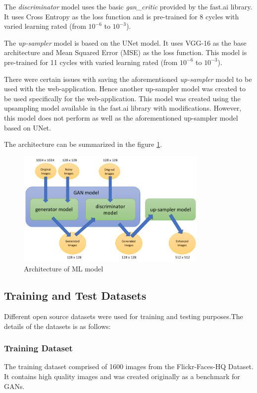 \documentclass[conference]{IEEEtran}
\begin{document}
			\par The \emph{discriminator} model uses the basic \emph{gan\_critic} provided by the fast.ai library\cite{b7}. It uses Cross Entropy\cite{b13} as the loss function and is pre-trained for 8 cycles with varied learning rated (from $10^{-6}$ to $10^{-3}$).
			
			\par The \emph{up-sampler} model is based on the UNet model\cite{b10}. It uses VGG-16\cite{b14} as the base architecture and Mean Squared Error (MSE)\cite{b12} as the loss function. This model is pre-trained for 11 cycles with varied learning rated (from $10^{-6}$ to $10^{-3}$).
			
			\par There were certain issues with saving the aforementioned \emph{up-sampler} model to be used with the web-application. Hence another up-sampler model was created to be used specifically for the web-application. This model was created using the upsampling model available in the fast.ai library\cite{b7} with modifications. However, this model does not perform as well as the aforementioned up-sampler model based on UNet.
			
			\par The architecture can be summarized in the figure \ref{arch-fig}.
			
				\begin{figure}[htbp]
				\centerline{\includegraphics[width=25em]{arch_srgan.png}}
				\caption{Architecture of ML model}
				\label{arch-fig}
			\end{figure}
			
		\subsection{Training and Test Datasets}
			Different open source datasets were used for training and testing purposes.The details of the datasets is as follows:
			
			\subsubsection{Training Dataset}
				The training dataset comprised of 1600 images from the Flickr-Faces-HQ Dataset. It contains high quality images and was created originally as a benchmark for GANs\cite{b8}.
				
\end{document}
